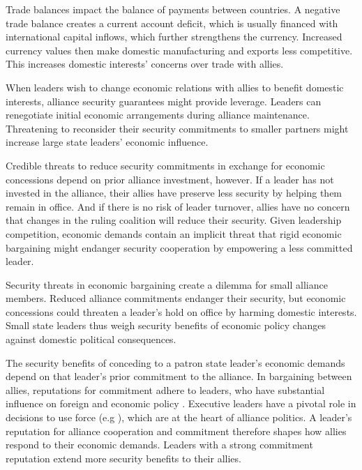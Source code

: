 \documentclass[12pt]{article}
\begin{document}
Trade balances impact the balance of payments between countries.
A negative trade balance creates a current account deficit, which is usually financed with international capital inflows, which further strengthens the currency. 
Increased currency values then make domestic manufacturing and exports less competitive. 
This increases domestic interests' concerns over trade with allies. 


When leaders wish to change economic relations with allies to benefit domestic interests, alliance security guarantees might provide leverage. 
Leaders can renegotiate initial economic arrangements during alliance maintenance. 
Threatening to reconsider their security commitments to smaller partners might increase large state leaders' economic influence. 


Credible threats to reduce security commitments in exchange for economic concessions depend on prior alliance investment, however. 
If a leader has not invested in the alliance, their allies have preserve less security by helping them remain in office. 
And if there is no risk of leader turnover, allies have no concern that changes in the ruling coalition will reduce their security. 
Given leadership competition, economic demands contain an implicit threat that rigid economic bargaining might endanger security cooperation by empowering a less committed leader.


Security threats in economic bargaining create a dilemma for small alliance members. 
Reduced alliance commitments endanger their security, but economic concessions could threaten a leader's hold on office by harming domestic interests. 
Small state leaders thus weigh security benefits of economic policy changes against domestic political consequences.


The security benefits of conceding to a patron state leader's economic demands depend on that leader's prior commitment to the alliance. 
In bargaining between allies, reputations for commitment adhere to leaders, who have substantial influence on foreign and economic policy \citep{Renshonetal2018}.
Executive leaders have a pivotal role in decisions to use force (e.g \citep{Colgan2013, ColganWeeks2015}), which are at the heart of alliance politics.
A leader's reputation for alliance cooperation and commitment therefore shapes how allies respond to their economic demands. 
Leaders with a strong commitment reputation extend more security benefits to their allies. 
\end{document}
